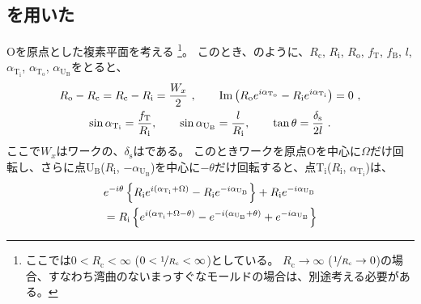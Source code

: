 \subsection{\Spacer を用いた\ReAlocation}
\CurvatureCenter{}Oを原点とした複素平面を考える
\footnote{ここでは$0 < R_\mathrm c < \infty$ ($0 < \nicefrac1{R_\mathrm c} < \infty$)としている。
$R_\mathrm c \to \infty$ ($\nicefrac1{R_\mathrm c} \to 0$)の場合、すなわち湾曲のないまっすぐなモールドの場合は、別途考える必要がある。}。
このとき、のように、$R_\mathrm c$, $R_\mathrm i$, $R_\mathrm o$, $f_\mathrm T$, $f_\mathrm B$, $l$, $\alpha_{\mathrm T_\mathrm i}$, $\alpha_{\mathrm T_\mathrm o}$, $\alpha_{\mathrm U_\mathrm B}$をとると、
\begin{subequations}
\begin{gather}
  \label{eq:constraintUpoint1}
  R_\mathrm o - R_\mathrm c = R_\mathrm c - R_\mathrm i = \frac{W_x}2~, \qquad
  \operatorname{Im}\left(R_\mathrm oe^{i\alpha_{\mathrm T_\mathrm o}} - R_\mathrm ie^{i\alpha_{\mathrm T_\mathrm i}}\right)
  = 0~,\\
  \label{eq:constraintUpoint2}
  \sin\alpha_{\mathrm T_\mathrm i} = \frac{f_\mathrm T}{R_\mathrm i}, \qquad
  \sin\alpha_{\mathrm U_\mathrm B} = \frac l{R_\mathrm i}, \qquad
  \tan\theta = \frac{\delta_\mathrm s}{2l}~.
\end{gather}
\end{subequations}
ここで$W_x$はワークの\ACOD、$\delta_\mathrm s$は\textbf{\SpacerThickness}である。
このときワークを原点Oを中心に$\Omega$だけ回転し、さらに点U$_\mathrm B$($R_\mathrm i$, $-\alpha_{\mathrm U_\mathrm B}$)を中心に$-\theta$だけ回転すると、点T$_\mathrm i$($R_\mathrm i$, $\alpha_{\mathrm T_\mathrm i}$)は、
\begin{align}
  \notag
  & e^{-i\theta}\left\{R_\mathrm ie^{i(\alpha_{\mathrm T_\mathrm i} + \Omega)} - R_\mathrm ie^{-i\alpha_{\mathrm U_\mathrm B}}\right\}
    +R_\mathrm ie^{-i\alpha_{\mathrm U_\mathrm B}}\\
  &= R_\mathrm i
     \left\{
       e^{i(\alpha_{\mathrm T_\mathrm i} + \Omega - \theta)} - e^{-i(\alpha_{\mathrm U_\mathrm B} + \theta)} + e^{-i\alpha_{\mathrm U_\mathrm B}}
     \right\}
  \label{eq:afterftUpoint}
\end{align}
